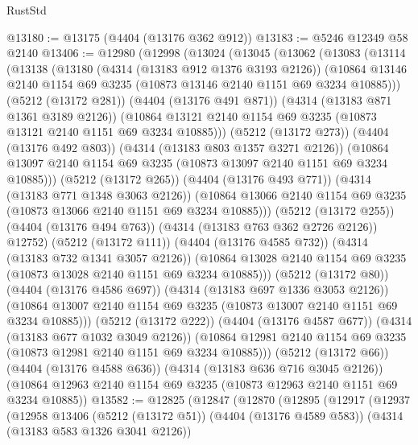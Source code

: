\begin{lexlean}{RustStd}
\begin{coremodule}
@13180 := @13175 (@4404 (@13176 @362 @912))
@13183 := @5246 @12349 @58 @2140
@13406 := @12980
    (@12998
      (@13024
        (@13045
          (@13062
            (@13083
              (@13114
                (@13138
                  (@13180
                    (@4314 (@13183 @912 @1376 @3193 @2126))
                    (@10864
                      @13146
                      @2140
                      @1154
                      @69
                      @3235
                      (@10873 @13146 @2140 @1151 @69 @3234 @10885)))
                  (@5212 (@13172 @281))
                  (@4404 (@13176 @491 @871))
                  (@4314 (@13183 @871 @1361 @3189 @2126))
                  (@10864
                    @13121
                    @2140
                    @1154
                    @69
                    @3235
                    (@10873 @13121 @2140 @1151 @69 @3234 @10885)))
                (@5212 (@13172 @273))
                (@4404 (@13176 @492 @803))
                (@4314 (@13183 @803 @1357 @3271 @2126))
                (@10864 @13097 @2140 @1154 @69 @3235 (@10873 @13097 @2140 @1151 @69 @3234 @10885)))
              (@5212 (@13172 @265))
              (@4404 (@13176 @493 @771))
              (@4314 (@13183 @771 @1348 @3063 @2126))
              (@10864 @13066 @2140 @1154 @69 @3235 (@10873 @13066 @2140 @1151 @69 @3234 @10885)))
            (@5212 (@13172 @255))
            (@4404 (@13176 @494 @763))
            (@4314 (@13183 @763 @362 @2726 @2126))
            @12752)
          (@5212 (@13172 @111))
          (@4404 (@13176 @4585 @732))
          (@4314 (@13183 @732 @1341 @3057 @2126))
          (@10864 @13028 @2140 @1154 @69 @3235 (@10873 @13028 @2140 @1151 @69 @3234 @10885)))
        (@5212 (@13172 @80))
        (@4404 (@13176 @4586 @697))
        (@4314 (@13183 @697 @1336 @3053 @2126))
        (@10864 @13007 @2140 @1154 @69 @3235 (@10873 @13007 @2140 @1151 @69 @3234 @10885)))
      (@5212 (@13172 @222))
      (@4404 (@13176 @4587 @677))
      (@4314 (@13183 @677 @1032 @3049 @2126))
      (@10864 @12981 @2140 @1154 @69 @3235 (@10873 @12981 @2140 @1151 @69 @3234 @10885)))
    (@5212 (@13172 @66))
    (@4404 (@13176 @4588 @636))
    (@4314 (@13183 @636 @716 @3045 @2126))
    (@10864 @12963 @2140 @1154 @69 @3235 (@10873 @12963 @2140 @1151 @69 @3234 @10885))
@13582 := @12825
    (@12847
      (@12870
        (@12895
          (@12917
            (@12937
              (@12958
                @13406
                (@5212 (@13172 @51))
                (@4404 (@13176 @4589 @583))
                (@4314 (@13183 @583 @1326 @3041 @2126))

\end{coremodule}
\end{lexlean}
